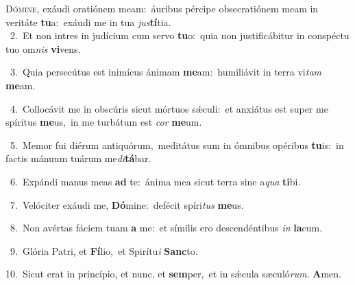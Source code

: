\lettrine{\initial\textcolor{\initialcolor}{D}}{ómine,} exáudi oratiónem meam:~\dagger áuribus pércipe obsecratiónem meam in veritáte \textbf{tu}\-a:~\star exáudi me in tua \textit{jus}\-\textbf{tí}tia.\\
{\numbfont\textcolor{\numbcolor}{~2.}}~Et non intres in judícium cum servo \textbf{tu}\-o:~\star quia non justificábitur in conspéctu tuo om\textit{nis} \textbf{vi}\-vens.\par
{\numbfont\textcolor{\numbcolor}{~3.}}~Quia persecútus est inimícus ánimam \textbf{me}\-am:~\star humiliávit in terra vi\textit{tam} \textbf{me}\-am.\par
{\numbfont\textcolor{\numbcolor}{~4.}}~Collocávit me in obscúris sicut mórtuos sǽculi:~\dagger et anxiátus est super me spíritus \textbf{me}\-us,~\star in me turbátum est \textit{cor} \textbf{me}\-um.\par
{\numbfont\textcolor{\numbcolor}{~5.}}~Memor fui diérum antiquórum,~\dagger meditátus sum in ómnibus opéribus \textbf{tu}\-is:~\star in factis mánuum tuárum me\-\textit{di}\-\textbf{tá}bar.\par
{\numbfont\textcolor{\numbcolor}{~6.}}~Expándi manus meas \textbf{ad} te:~\star ánima mea sicut terra sine a\textit{qua} \textbf{ti}\-bi.\par
{\numbfont\textcolor{\numbcolor}{~7.}}~Velóciter exáudi me, \textbf{Dó}\-mine:~\star defécit spíri\textit{tus} \textbf{me}\-us.\par
{\numbfont\textcolor{\numbcolor}{~8.}}~Non avértas fáciem tuam \textbf{a} me:~\star et símilis ero descendéntibus \textit{in} \textbf{la}\-cum.\par
{\numbfont\textcolor{\numbcolor}{~9.}}~Glória Patri, et \textbf{Fí}\-lio,~\star et Spirítu\textit{i} \textbf{Sanc}\-to.\par
{\numbfont\textcolor{\numbcolor}{10.}}~Sicut erat in princípio, et nunc, et \textbf{sem}\-per,~\star et in sǽcula sæculó\-\textit{rum}\-. \textbf{A}\-men.\par
